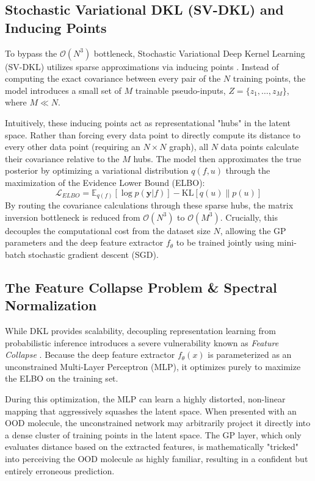 \subsection{Stochastic Variational DKL (SV-DKL) and Inducing Points}
To bypass the $\mathcal{O}(N^3)$ bottleneck, Stochastic Variational Deep Kernel Learning (SV-DKL) utilizes sparse approximations via inducing points \cite{wilson2016stochastic}. Instead of computing the exact covariance between every pair of the $N$ training points, the model introduces a small set of $M$ trainable pseudo-inputs, $Z = \{z_1, \dots, z_M\}$, where $M \ll N$.

Intuitively, these inducing points act as representational "hubs" in the latent space. Rather than forcing every data point to directly compute its distance to every other data point (requiring an $N \times N$ graph), all $N$ data points calculate their covariance relative to the $M$ hubs. The model then approximates the true posterior by optimizing a variational distribution $q(f, u)$ through the maximization of the Evidence Lower Bound (ELBO):
\begin{equation}
    \mathcal{L}_{ELBO} = \mathbb{E}_{q(f)}[\log p(\mathbf{y}|f)] - \text{KL}[q(u) \parallel p(u)]
\end{equation}
By routing the covariance calculations through these sparse hubs, the matrix inversion bottleneck is reduced from $\mathcal{O}(N^3)$ to $\mathcal{O}(M^3)$. Crucially, this decouples the computational cost from the dataset size $N$, allowing the GP parameters and the deep feature extractor $f_\theta$ to be trained jointly using mini-batch stochastic gradient descent (SGD).

\subsection{The Feature Collapse Problem \& Spectral Normalization}
While DKL provides scalability, decoupling representation learning from probabilistic inference introduces a severe vulnerability known as \textit{Feature Collapse} \cite{vanamersfoort2021feature}. Because the deep feature extractor $f_\theta(x)$ is parameterized as an unconstrained Multi-Layer Perceptron (MLP), it optimizes purely to maximize the ELBO on the training set. 

During this optimization, the MLP can learn a highly distorted, non-linear mapping that aggressively squashes the latent space. When presented with an OOD molecule, the unconstrained network may arbitrarily project it directly into a dense cluster of training points in the latent space. The GP layer, which only evaluates distance based on the extracted features, is mathematically "tricked" into perceiving the OOD molecule as highly familiar, resulting in a confident but entirely erroneous prediction.

